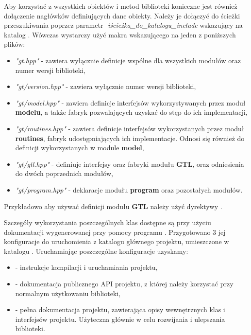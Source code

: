 \documentclass{standalone}
\begin{document}
Aby korzystać z wszystkich obiektów i metod biblioteki konieczne jest również dołączenie nagłówków definiujących
dane obiekty. Należy je dołączyć do ścieżki przeszukiwania poprzez parametr \textit{-iścieżka\_do\_katalogu\_include}
wskazujący na katalog . Wówczas wystarczy użyć makra  wskazującego na jeden z poniższych
plików:
\begin{itemize}
\item \textit{"gt.hpp"} - zawiera wyłącznie definicje wspólne dla wszystkich modułów oraz numer wersji biblioteki,
\item \textit{"gt/version.hpp"} - zawiera wyłącznie numer wersji biblioteki,
\item \textit{"gt/model.hpp"} - zawiera definicje interfejsów wykorzystywanych przez moduł \textbf{modelu}, a także 
fabryk pozwalających uzyskać do stęp do ich implementacji,
\item \textit{"gt/routines.hpp"} - zawiera definicje interfejsów wykorzystanych przez moduł \textbf{routines}, fabryk
udostępniających ich implementacje. Odnosi się również do definicji wykorzystanych w module \textbf{model},
\item \textit{"gt/gtl.hpp"} - definiuje interfejsy oraz fabryki modułu \textbf{GTL}, oraz odniesienia do dwóch poprzednich
modułów,
\item \textit{"gt/program.hpp"} - deklaracje modułu \textbf{program} oraz pozostałych modułów.
\end{itemize}

Przykładowo aby używać definicji modułu \textbf{GTL} należy użyć dyrektywy .

Szczegóły wykorzystania poszczególnych klas dostępne są przy użyciu dokumentacji wygenerowanej przy pomocy programu
. Przygotowano 3 jej konfiguracje do uruchomienia z katalogu głównego projektu, umieszczone w katalogu
. Uruchamiając poszczególne konfiguracje uzyskamy:
\begin{itemize}
\item {} - instrukcje kompilacji i uruchamiania projektu,
\item {} - dokumentacja publicznego API projektu, z której należy korzystać przy normalnym
użytkowaniu biblioteki,
\item {} - pełna dokumentacja projektu, zawierająca opisy wewnętrznych klas i interfejsów
projektu. Użyteczna głównie w celu rozwijania i ulepszania biblioteki.
\end{itemize}
\end{document}
